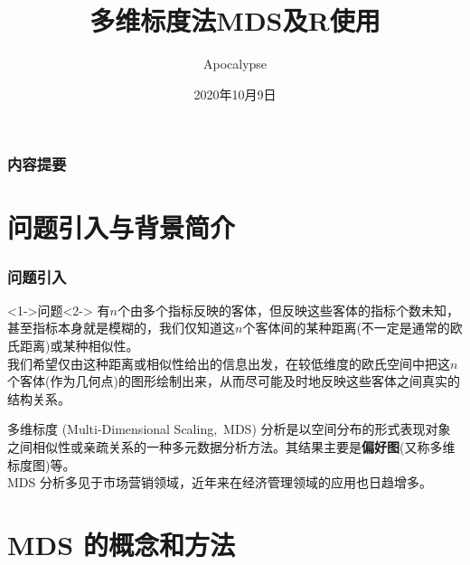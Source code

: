 \documentclass[UTF8, compress]{ctexbeamer}
\title{{\heiti 多维标度法}{\sffamily MDS}{\heiti 及}{\sffamily R}{\heiti 使用}}
\author{Apocalypse}
\date{\heiti 2020年10月9日}
\institute[{\sffamily CUGB}]{\heiti 中国地质大学(北京) \quad 数理学院}
\begin{document}
	
	\begin{frame}
		\titlepage
	\end{frame}
	
	\begin{frame}
		\frametitle{\heiti 内容提要}
		\tableofcontents 
	\end{frame}
	
\section{{\heiti 问题引入与背景简介}}
	\frame{\tableofcontents[currentsection]}
	\begin{frame}
	\frametitle{\heiti 问题引入}
		\begin{exampleblock}<1->{\heiti 问题}<2->
			有$n$个由多个指标反映的客体，但反映这些客体的指标个数未知，甚至指标本身就是模糊的，我们仅知道这$n$个客体间的某种距离(不一定是通常的欧氏距离)或某种相似性。\\
			\vspace{.25cm}
			\onslide<3->
			我们希望仅由这种距离或相似性给出的信息出发，在较低维度的欧氏空间中把这$n$个客体(作为几何点)的图形绘制出来，从而尽可能及时地反映这些客体之间真实的结构关系。
		\end{exampleblock}
		
		\onslide<4->
			\vspace{0.5cm}
			多维标度 (Multi-Dimensional Scaling,\ MDS) 分析是以空间分布的形式表现对象之间相似性或亲疏关系的一种多元数据分析方法。其结果主要是\textbf{偏好图}(又称多维标度图)等。\\
			
		\onslide<5->
			\vspace{.5cm}
			MDS 分析多见于市场营销领域，近年来在经济管理领域的应用也日趋增多。
	\end{frame}



\section{{\sffamily MDS} {\heiti 的概念和方法}}
	\frame{\tableofcontents[currentsection]}
	
\end{document}
